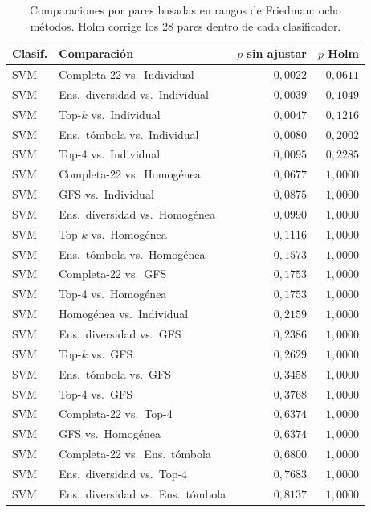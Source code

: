 \begin{table}[H]
\centering\fontsize{8}{10}\selectfont\setlength{\tabcolsep}{3.0pt}
\caption{Comparaciones por pares basadas en rangos de Friedman: ocho métodos. Holm corrige los 28 pares dentro de cada clasificador.}
\label{tab:sel-metodos-holm}
\begin{tabular}{@{}llrr@{}}
\toprule
Clasif. & Comparación & $p$ sin ajustar & $p$ Holm \\
\midrule
SVM & Completa-22 vs.\ Individual & $0{,}0022$ & $0{,}0611$ \\
SVM & Ens.\ diversidad vs.\ Individual & $0{,}0039$ & $0{,}1049$ \\
SVM & Top-$k$ vs.\ Individual & $0{,}0047$ & $0{,}1216$ \\
SVM & Ens.\ tómbola vs.\ Individual & $0{,}0080$ & $0{,}2002$ \\
SVM & Top-4 vs.\ Individual & $0{,}0095$ & $0{,}2285$ \\
SVM & Completa-22 vs.\ Homogénea & $0{,}0677$ & $1{,}0000$ \\
SVM & GFS vs.\ Individual & $0{,}0875$ & $1{,}0000$ \\
SVM & Ens.\ diversidad vs.\ Homogénea & $0{,}0990$ & $1{,}0000$ \\
SVM & Top-$k$ vs.\ Homogénea & $0{,}1116$ & $1{,}0000$ \\
SVM & Ens.\ tómbola vs.\ Homogénea & $0{,}1573$ & $1{,}0000$ \\
SVM & Completa-22 vs.\ GFS & $0{,}1753$ & $1{,}0000$ \\
SVM & Top-4 vs.\ Homogénea & $0{,}1753$ & $1{,}0000$ \\
SVM & Homogénea vs.\ Individual & $0{,}2159$ & $1{,}0000$ \\
SVM & Ens.\ diversidad vs.\ GFS & $0{,}2386$ & $1{,}0000$ \\
SVM & Top-$k$ vs.\ GFS & $0{,}2629$ & $1{,}0000$ \\
SVM & Ens.\ tómbola vs.\ GFS & $0{,}3458$ & $1{,}0000$ \\
SVM & Top-4 vs.\ GFS & $0{,}3768$ & $1{,}0000$ \\
SVM & Completa-22 vs.\ Top-4 & $0{,}6374$ & $1{,}0000$ \\
SVM & GFS vs.\ Homogénea & $0{,}6374$ & $1{,}0000$ \\
SVM & Completa-22 vs.\ Ens.\ tómbola & $0{,}6800$ & $1{,}0000$ \\
SVM & Ens.\ diversidad vs.\ Top-4 & $0{,}7683$ & $1{,}0000$ \\
SVM & Ens.\ diversidad vs.\ Ens.\ tómbola & $0{,}8137$ & $1{,}0000$ \\

\end{tabular}
\end{table}
